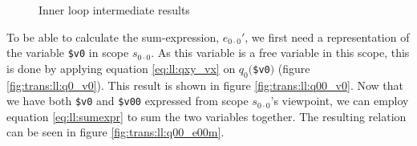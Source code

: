 \begin{figure}[!h]
\centering
{}
\qquad
{}
\qquad 
{}
\caption{Inner loop intermediate results \label{fig:trans:ll:innerIntermediate}}
\end{figure}

To be able to calculate the sum-expression, $e_{0 \cdot 0}'$, we first need a representation of the variable
\texttt{\$v0} in scope $s_{0 \cdot 0}$. As this variable is a free variable in this scope, this is done by
applying equation \ref{eq:ll:qxy_vx} on $q_{0}($\texttt{\$v0}$)$ (figure \ref{fig:trans:ll:q0_v0}). This
result is shown in figure \ref{fig:trans:ll:q00_v0}. Now that we have both \texttt{\$v0} and \texttt{\$v00}
expressed from scope $s_{0 \cdot 0}$'s viewpoint, we can employ equation \ref{eq:ll:sumexpr} to sum the two variables together. The
resulting relation can be seen in figure \ref{fig:trans:ll:q00_e00m}.

